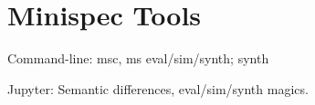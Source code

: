 \section{Minispec Tools}
\label{sec:tools}



Command-line: msc, ms eval/sim/synth; synth

Jupyter: Semantic differences, eval/sim/synth magics.

